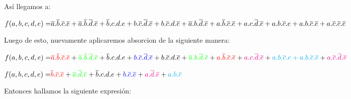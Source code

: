 \noindent
As\'i llegamos a:\vspace{5mm}\par

$
\color{black}{f(a,b,c,d,e) =}  \overline{a}.\overline{b}.\overline{c}.\overline{e} \color{black}+
\vspace{3mm}\overline{a}.\overline{b}.\overline{d}.\overline{e} \color{black}+ \overline{b}.c.d.e \color{black}+ b.\overline{c}.\overline{d}.\overline{e} \color{black}+ b.\overline{c}.d.\overline{e} \color{black}+ \overline{a}.b.\overline{d}.\overline{e} \color{black}+ a.\overline{b}.\overline{c}.\overline{e} \color{black}+ a.c.\overline{d}.\overline{e} \color{black}+ a.b.\overline{c}.e \color{black}+ a.b.\overline{c}.\overline{e} \color{black}+ a.\overline{c}.\overline{c}.\overline{e}$
\vspace{5mm}\par

\noindent
Luego de esto, nuevamente aplicaremos absorcion de la siguiente manera:\vspace{5mm}\par

$
\color{black}{f(a,b,c,d,e) =}  \color{red}{\overline{a}.\overline{b}.\overline{c}.\overline{e}} \color{black}+
\vspace{3mm}\color{green}{\overline{a}.\overline{b}.\overline{d}.\overline{e}} \color{black}+ \color{black}{\overline{b}.c.d.e} \color{black}+ \color{blue}{b.\overline{c}.\overline{d}.\overline{e} \color{black}+ b.\overline{c}.d.\overline{e}} \color{black}+ \color{green}{\overline{a}.b.\overline{d}.\overline{e}} \color{black}+ \color{red}{a.\overline{b}.\overline{c}.\overline{e}} \color{black}+ \color{magenta}{a.c.\overline{d}.\overline{e}} \color{black}+ \color{cyan}{a.b.\overline{c}.e + a.b.\overline{c}.\overline{e}} \color{black}+ \color{magenta}{a.\overline{c}.\overline{d}.\overline{e}}$
\vspace{5mm}\par
$
\color{black}{f(a,b,c,d,e) =}  \color{red}{\overline{b}.\overline{c}.\overline{e}} \color{black}+ \color{green}{\overline{a}.\overline{d}.\overline{e}} \color{black}+ \color{black}{\overline{b}.c.d.e} \color{black}+ \color{blue}{b.\overline{c}.\overline{e}} \color{black}+ \color{magenta}{a.\overline{d}.\overline{e}} \color{black}+ \color{cyan}{a.b.\overline{c}}$
\vspace{5mm}\par

Entonces hallamos la siguiente expresi\'on:\vspace{5mm}\par

